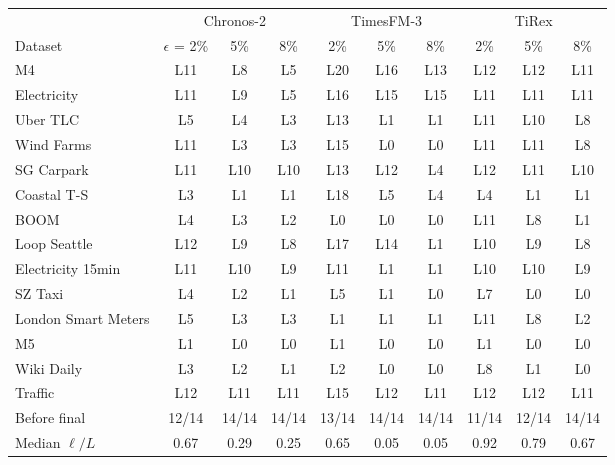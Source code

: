 \begin{tabular}{l ccc ccc ccc}
\toprule
 & \multicolumn{3}{c}{Chronos-2} & \multicolumn{3}{c}{TimesFM-3} & \multicolumn{3}{c}{TiRex} \\
\cmidrule(lr){2-4}\cmidrule(lr){5-7}\cmidrule(lr){8-10}
Dataset & $\epsilon$ = 2\% & 5\% & 8\% & 2\% & 5\% & 8\% & 2\% & 5\% & 8\% \\
\midrule
M4 & L11 & L8 & L5 & L20 & L16 & L13 & L12 & L12 & L11 \\
Electricity & L11 & L9 & L5 & L16 & L15 & L15 & L11 & L11 & L11 \\
Uber TLC & L5 & L4 & L3 & L13 & L1 & L1 & L11 & L10 & L8 \\
Wind Farms & L11 & L3 & L3 & L15 & L0 & L0 & L11 & L11 & L8 \\
SG Carpark & L11 & L10 & L10 & L13 & L12 & L4 & L12 & L11 & L10 \\
Coastal T-S & L3 & L1 & L1 & L18 & L5 & L4 & L4 & L1 & L1 \\
BOOM & L4 & L3 & L2 & L0 & L0 & L0 & L11 & L8 & L1 \\
Loop Seattle & L12 & L9 & L8 & L17 & L14 & L1 & L10 & L9 & L8 \\
Electricity 15min & L11 & L10 & L9 & L11 & L1 & L1 & L10 & L10 & L9 \\
SZ Taxi & L4 & L2 & L1 & L5 & L1 & L0 & L7 & L0 & L0 \\
London Smart Meters & L5 & L3 & L3 & L1 & L1 & L1 & L11 & L8 & L2 \\
M5 & L1 & L0 & L0 & L1 & L0 & L0 & L1 & L0 & L0 \\
Wiki Daily & L3 & L2 & L1 & L2 & L0 & L0 & L8 & L1 & L0 \\
Traffic & L12 & L11 & L11 & L15 & L12 & L11 & L12 & L12 & L11 \\
\midrule
Before final & 12/14 & 14/14 & 14/14 & 13/14 & 14/14 & 14/14 & 11/14 & 12/14 & 14/14 \\
Median $\ell/L$ & 0.67 & 0.29 & 0.25 & 0.65 & 0.05 & 0.05 & 0.92 & 0.79 & 0.67 \\
\bottomrule
\end{tabular}

